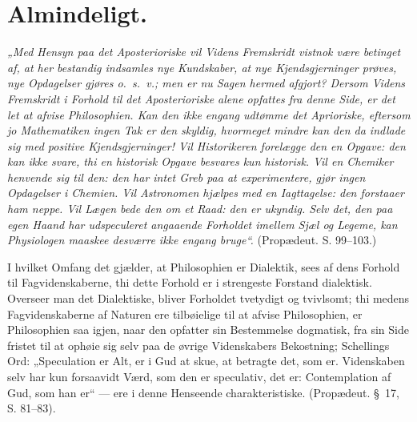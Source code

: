 \documentclass[12pt,a4paper]{book}
\begin{document}
\section*{Almindeligt.}

\emph{„Med Hensyn paa det Aposterioriske vil Videns Fremskridt vistnok
være betinget af, at her bestandig indsamles nye Kundskaber, at nye
Kjendsgjerninger prøves, nye Opdagelser gjøres o.~s.~v.; men er nu
Sagen hermed afgjort? Dersom Videns Fremskridt i Forhold til det
Aposterioriske alene opfattes fra denne Side, er det let at afvise
Philosophien. Kan den ikke engang udtømme det Aprioriske, eftersom jo
Mathematiken ingen Tak er den skyldig, hvormeget mindre kan den da
indlade sig med positive Kjendsgjerninger! Vil Historikeren forelægge
den en Opgave: den kan ikke svare, thi en historisk Opgave besvares
kun historisk. Vil en Chemiker henvende sig til den: den har intet
Greb paa at experimentere, gjør ingen Opdagelser i Chemien. Vil
Astronomen hjælpes med en Iagttagelse: den forstaaer ham neppe. Vil
Lægen bede den om et Raad: den er ukyndig. Selv det, den paa egen
Haand har udspeculeret angaaende Forholdet imellem Sjæl og Legeme, kan
Physiologen maaskee desværre ikke engang bruge“.} (Propædeut.
S. 99--103.)

I hvilket Omfang det gjælder, at Philosophien er Dialektik, sees af
dens Forhold til Fagvidenskaberne, thi dette Forhold er i strengeste
Forstand dialektisk. Overseer man det Dialektiske, bliver Forholdet
tvetydigt og tvivlsomt; thi medens Fagvidenskaberne af Naturen ere
tilbøielige til at afvise Philosophien, er Philosophien saa igjen,
naar den opfatter sin Bestemmelse dogmatisk, fra sin Side fristet til
at ophøie sig selv paa de øvrige Videnskabers Bekostning; Schellings
Ord: „Speculation er Alt, er i Gud at skue, at betragte det, som er.
Videnskaben selv har kun forsaavidt Værd, som den er speculativ, det
er: Contemplation af Gud, som han er“ --- ere i denne Henseende
charakteristiske. (Propædeut. §~17, S. 81--83).
\end{document}
